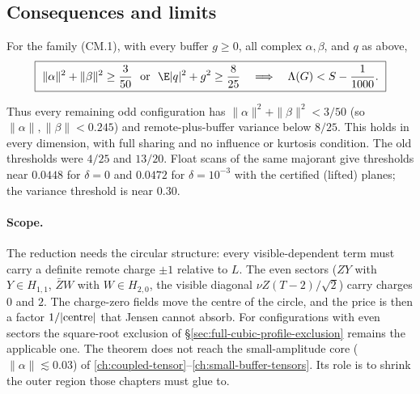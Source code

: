\subsection{Consequences and limits}
\label{sec:cm-consequences}
\begin{theorem}\label{thm:cm-exclusion}
For the family (CM.1), with every buffer $g\ge0$, all complex $\alpha,\beta$, and $q$ as above,
\[
 \boxed{\ \|\alpha\|^2+\|\beta\|^2\ge\frac3{50}\ \ \text{or}\ \ \E|q|^2+g^2\ge\frac8{25}\quad\Longrightarrow\quad\Lambda(G)<S-\frac1{1000}.\ }
\]
\end{theorem}
Thus every remaining odd configuration has $\|\alpha\|^2+\|\beta\|^2<3/50$ (so $\|\alpha\|,\|\beta\|<0.245$) and remote-plus-buffer variance below
$8/25$. This holds in every dimension, with full sharing and no influence or kurtosis condition. The old thresholds were $4/25$ and $13/20$. Float scans
of the same majorant give thresholds near $0.0448$ for $\delta=0$ and $0.0472$ for $\delta=10^{-3}$ with the certified (lifted) planes; the variance threshold is near $0.30$.

\paragraph{Scope.} The reduction needs the circular structure: every visible-dependent term must carry a definite remote charge $\pm1$ relative to $L$. The
even sectors ($ZY$ with $Y\in H_{1,1}$, $\bar ZW$ with $W\in H_{2,0}$, the visible diagonal $\nu Z(T-2)/\sqrt2$) carry charges $0$ and $2$. The charge-zero
fields move the centre of the circle, and the price is then a factor $1/|{\rm centre}|$ that Jensen cannot absorb. For configurations with even sectors the
square-root exclusion of \S\ref{sec:full-cubic-profile-exclusion} remains the applicable one. The theorem does not reach the small-amplitude core
($\|\alpha\|\lesssim0.03$) of \autoref{ch:coupled-tensor}--\autoref{ch:small-buffer-tensors}. Its role is to shrink the outer region those chapters must glue to.
